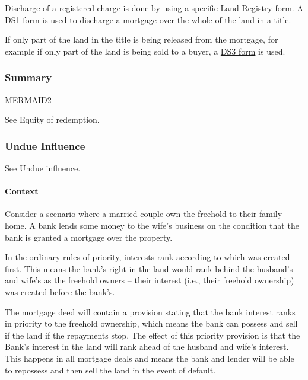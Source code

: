\documentclass[
]{article}
\begin{document}
Discharge of a registered charge is done by using a specific Land
Registry form. A
\href{https://assets.publishing.service.gov.uk/government/uploads/system/uploads/attachment_data/file/808695/DS1__2019-06-17_.pdf}{DS1
form} is used to discharge a mortgage over the whole of the land in a
title.

If only part of the land in the title is being released from the
mortgage, for example if only part of the land is being sold to a buyer,
a
\href{https://assets.publishing.service.gov.uk/government/uploads/system/uploads/attachment_data/file/713043/DS3__2018-05-25_.pdf}{DS3
form} is used.

\hypertarget{summary}{%
\subsubsection{Summary}\label{summary}}

MERMAID2

See Equity of redemption.

\hypertarget{undue-influence}{%
\subsubsection{Undue Influence}\label{undue-influence}}

See Undue influence.

\hypertarget{context-2}{%
\paragraph{Context}\label{context-2}}

Consider a scenario where a married couple own the freehold to their
family home. A bank lends some money to the wife's business on the
condition that the bank is granted a mortgage over the property.

In the ordinary rules of priority, interests rank according to which was
created first. This means the bank's right in the land would rank behind
the husband's and wife's as the freehold owners -- their interest (i.e.,
their freehold ownership) was created before the bank's.

The mortgage deed will contain a provision stating that the bank
interest ranks in priority to the freehold ownership, which means the
bank can possess and sell if the land if the repayments stop. The effect
of this priority provision is that the Bank's interest in the land will
rank ahead of the husband and wife's interest. This happens in all
mortgage deals and means the bank and lender will be able to repossess
and then sell the land in the event of default.
\end{document}
